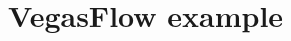 \documentclass[../main/main.tex]{subfiles}
\begin{document}
\chapter{VegasFlow example}
\end{document}
